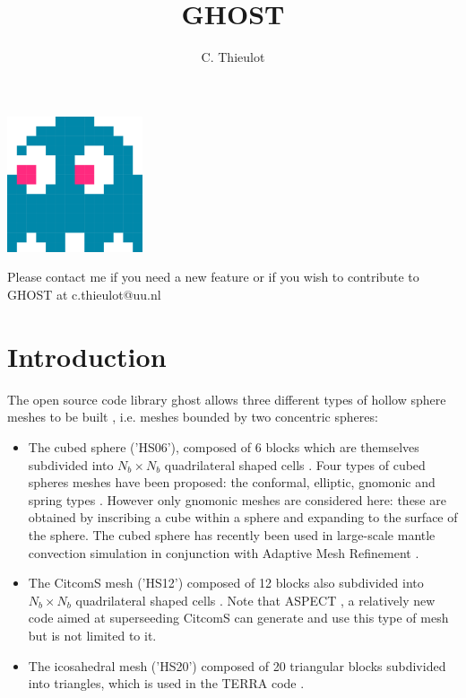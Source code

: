 \documentclass[a4paper]{article}
\author{C. Thieulot}
\title{GHOST}
\begin{document}
\maketitle

\begin{center}
\includegraphics[width=4cm]{ghost}
\end{center}

\tableofcontents

Please contact me if you need a new feature or if you wish to contribute to GHOST at 
c.thieulot@uu.nl

\section{Introduction}

The open source code library {\sc ghost} allows 
three different types of hollow sphere meshes to be built
, i.e. meshes bounded by two concentric spheres:

\begin{itemize}
\item 
The cubed sphere ('HS06'), composed of 6 blocks which 
are themselves subdivided into $N_b \times N_b$ quadrilateral shaped cells  \cite{sado72,roip96,heta03,busa13}.
Four types of cubed spheres meshes have been proposed: the conformal, elliptic, gnomonic and spring types \cite{puli07}.
However only gnomonic meshes are considered here: these are obtained by inscribing a cube within a sphere and expanding to the surface
of the sphere.
The cubed sphere has recently been used in large-scale mantle convection simulation in conjunction with 
Adaptive Mesh Refinement \cite{algs12,busa13}.  

\item 
The CitcomS mesh ('HS12') composed of 12 blocks also subdivided 
into $N_b \times N_b$ quadrilateral shaped cells
\cite{zhzm00,sthh06,zhmt08,arfw14}.
Note that ASPECT \cite{krhb12,hedg17}, a relatively new code aimed at superseeding CitcomS can generate and use 
this type of mesh \cite{thie17} but is not limited to it.

\item The icosahedral mesh ('HS20') composed of 20 triangular blocks \cite{bafr85,baum85} subdivided into triangles, which is 
used in the TERRA code \cite{burb96,burb97,burl98,dadb13}.
\end{itemize}
\end{document}
